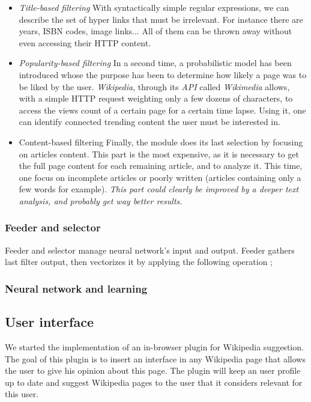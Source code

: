 \documentclass[11pt]{article}
\theoremstyle{plain}
\theoremstyle{definition}
\theoremstyle{remark}
\begin{document}
\begin{itemize}
\item \textit{Title-based filtering} With syntactically simple regular expressions, we can describe the set of hyper links that must be irrelevant. For instance there are years, ISBN codes, image links... All of them can be thrown away without even accessing their HTTP content.
\item \textit{Popularity-based filtering} In a second time, a probabilistic model has been introduced whose the purpose has been to determine how likely a page was to be liked by the user. \textit{Wikipedia}, through its \textit{API} called \textit{Wikimedia} allows, with a simple HTTP request weighting only a few dozens of characters, to access the views count of a certain page for a certain time lapse. Using it, one can identify connected trending content the user must be interested in.
\item {Content-based filtering} Finally, the module does its last selection by focusing on articles content. This part is the most expensive, as it is necessary to get the full page content for each remaining article, and to analyze it. This time, one focus on incomplete articles or poorly written (articles containing only a few words for example). \textit{This part could clearly be improved by a deeper text analysis, and probably get way better results.}
\end{itemize}

\subsubsection{Feeder and selector}

Feeder and selector manage neural network's input and output. Feeder gathers last filter output, then vectorizes it by applying the following operation ; 

\subsubsection{Neural network and learning}

\subsection{User interface}
We started the implementation of an in-browser plugin for Wikipedia suggestion.
The goal of this plugin is to insert an interface in any Wikipedia page that allows the user to give his opinion about this page. The plugin will keep an user profile up to date and suggest Wikipedia pages to the user that it considers relevant for this user.
\end{document}
